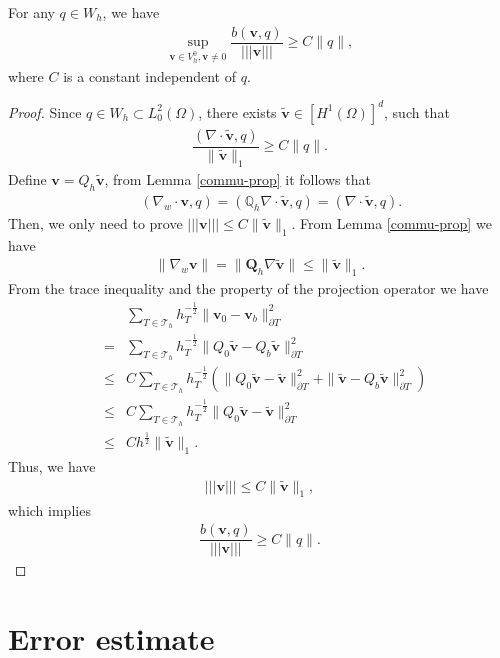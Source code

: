 \documentclass[leqno]{siamltex704}
\numberwithin{equation}{section}
\def\dQ{{\mathbb{Q}}}
\def\bQ{{\mathbf{Q}}}
\def\sumT{\sum_{T\in\mathcal{T}_h}}     %
\def\trb{|\!|\!|}
\def\bv{{\mathbf{v}}}
\begin{document}
\begin{lemma}\label{inf-sup}
  For any $q\in W_h$, we have
  \begin{eqnarray*}
    \sup_{\bv\in V_h^0, \bv\ne 0}\dfrac{b(\bv,q)}{\trb \bv\trb}\ge C\|q\|,
  \end{eqnarray*}
  where $C$ is a constant independent of $q$.
\end{lemma}
\begin{proof}
  Since $q\in W_h\subset L_0^2(\Omega)$, there exists $\tilde\bv\in [H^1(\Omega)]^d$, 
  such that
  \begin{eqnarray*}
    \dfrac{(\nabla\cdot \tilde\bv,q)}{\|\tilde\bv\|_1} \ge C\|q\|.
  \end{eqnarray*}
  Define $\bv = Q_h\tilde\bv$, from Lemma \ref{commu-prop} it follows that
  \begin{eqnarray*}
    &&(\nabla_w \cdot\bv,q) = (\dQ_h \nabla\cdot\tilde\bv,q) = (\nabla\cdot\tilde\bv,q).
  \end{eqnarray*}
  Then, we only need to prove $\trb\bv\trb\le C\|\tilde\bv\|_1$. From Lemma \ref{commu-prop}
  we have
  \begin{eqnarray*}
    \|\nabla_w \bv\| = \|\bQ_h\nabla\tilde\bv\| \le \|\tilde\bv\|_1.
  \end{eqnarray*}
  From the trace inequality and the property of the projection operator we have
  \begin{eqnarray*}
    &&\sumT h_T^{-\frac12}\|\bv_0-\bv_b\|_{\partial T}^2
    \\
    &=&\sumT h_T^{-\frac12}\|Q_0\tilde\bv-Q_b\tilde\bv\|_{\partial T}^2
    \\
    &\le&C\sumT h_T^{-\frac12}(\|Q_0\tilde\bv-\tilde\bv\|_{\partial T}^2+\|\tilde\bv-Q_b\tilde\bv\|_{\partial T}^2)
    \\
    &\le& C\sumT h_T^{-\frac12}\|Q_0\tilde\bv-\tilde\bv\|_{\partial T}^2
    \\
    &\le& Ch^{\frac12}\|\tilde\bv\|_1.
  \end{eqnarray*}
  Thus, we have
  \begin{eqnarray*}
    \trb\bv\trb\le C\|\tilde\bv\|_1,
  \end{eqnarray*}
  which implies
  \begin{eqnarray*}
    \dfrac{b(\bv,q)}{\trb \bv\trb}\ge C\|q\|.
  \end{eqnarray*}
\end{proof}

\section{Error estimate}
\end{document}
